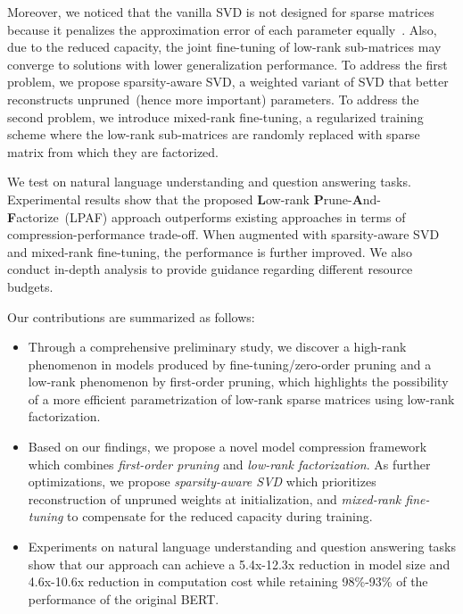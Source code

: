 Moreover, we noticed that the vanilla SVD is not designed for 
sparse matrices because it penalizes the approximation error of 
each parameter equally~\cite{group}. Also, due to the reduced capacity, 
the joint fine-tuning of low-rank sub-matrices may converge to 
solutions with lower generalization performance. To address the first problem, 
we propose sparsity-aware SVD, a weighted variant of SVD that 
better reconstructs unpruned~(hence more important) parameters. 
To address the second problem, we introduce mixed-rank fine-tuning, 
a regularized training scheme where the low-rank sub-matrices 
are randomly replaced with sparse matrix from which they are factorized. 


We test on natural language understanding and question answering tasks. Experimental results show that the proposed \textbf{L}ow-rank  \textbf{P}rune-\textbf{A}nd-\textbf{F}actorize~(LPAF) approach 
outperforms existing approaches in terms of compression-performance trade-off. When augmented with sparsity-aware SVD and mixed-rank fine-tuning, the performance is further improved. 
We also conduct in-depth analysis to provide 
guidance regarding different resource budgets.

Our contributions are summarized as follows:
\begin{itemize}
	\item Through a comprehensive preliminary study, 
	we discover a high-rank phenomenon in models produced by 
	fine-tuning/zero-order pruning and 
	a low-rank phenomenon by first-order pruning, 
	which highlights the possibility of a more efficient parametrization 
	of low-rank sparse matrices using low-rank factorization.
	\item Based on our findings, we propose a novel model compression framework which
	combines \textit{first-order pruning} and \textit{low-rank factorization}. 
	As further optimizations, we propose \textit{sparsity-aware SVD} which 
	prioritizes reconstruction of unpruned weights at initialization, 
	and \textit{mixed-rank fine-tuning} to compensate for the reduced capacity 
	during training.
	\item Experiments on natural language understanding and 
	question answering tasks show that our approach can achieve 
	a 5.4x-12.3x reduction in model size and 4.6x-10.6x reduction in 
	computation cost while 
	retaining 98\%-93\% of the performance of the original BERT.
\end{itemize}
